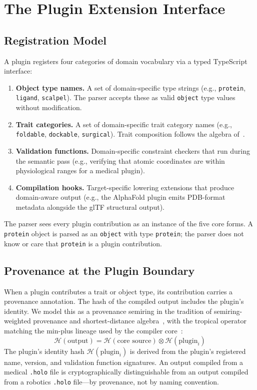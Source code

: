 \documentclass[sigconf,nonacm]{acmart}
\newcommand{\holo}{\texttt{.holo}}
\newcommand{\hashfn}{\mathcal{H}}
\newcommand{\tropmult}{\otimes}
\begin{document}
\section{The Plugin Extension Interface}
\label{sec:plugins}

\subsection{Registration Model}

A plugin registers four categories of domain vocabulary via
a typed TypeScript interface:

\begin{enumerate}
  \item \textbf{Object type names.} A set of domain-specific
    type strings (e.g., \texttt{protein}, \texttt{ligand},
    \texttt{scalpel}). The parser accepts these as valid
    \texttt{object} type values without modification.
  \item \textbf{Trait categories.} A set of domain-specific
    trait category names (e.g., \texttt{foldable},
    \texttt{dockable}, \texttt{surgical}). Trait composition
    follows the algebra of~\cite{paper-11-hsplus-ecoop2027}.
  \item \textbf{Validation functions.} Domain-specific
    constraint checkers that run during the semantic pass
    (e.g., verifying that atomic coordinates are within
    physiological ranges for a medical plugin).
  \item \textbf{Compilation hooks.} Target-specific lowering
    extensions that produce domain-aware output (e.g., the
    AlphaFold plugin emits PDB-format metadata alongside
    the glTF structural output).
\end{enumerate}

The parser sees every plugin contribution as an instance of
the five core forms. A \texttt{protein} object is parsed as
an \texttt{object} with type \texttt{protein}; the parser
does not know or care that \texttt{protein} is a plugin
contribution.

\subsection{Provenance at the Plugin Boundary}

When a plugin contributes a trait or object type, its
contribution carries a provenance annotation. The hash of
the compiled output includes the plugin's identity. We model this as
a provenance semiring in the tradition of semiring-weighted
provenance and shortest-distance algebra~\cite{green2007provenance,mohri2002semiring},
with the tropical operator matching the min-plus lineage used by the
compiler core~\cite{mikhalkin2005tropical}:
$$\hashfn(\text{output}) = \hashfn(\text{core source})
  \tropmult \hashfn(\text{plugin}_i)$$
The plugin's identity hash $\hashfn(\text{plugin}_i)$ is
derived from the plugin's registered name, version, and
validation function signatures. An output compiled from a
medical \holo{} file is cryptographically distinguishable
from an output compiled from a robotics \holo{} file---by
provenance, not by naming convention.
\end{document}
